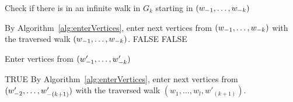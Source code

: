 \begin{algorithm}
  \caption{Check if there is in an infinite walk in $G_k$ starting in $\tuple{1}{k}$}
    \label{alg:checkCycles}
  \begin{algorithmic}[1]
		\STATE By Algorithm~\ref{alg:enterVertices}, enter next vertices from $\tuple{1}{k}$ with the traversed walk  $\tuple{1}{k}$.
	\ELSE
		\RETURN FALSE
	\ENDIF
	\RETURN FALSE
  \end{algorithmic}
\end{algorithm}

\begin{algorithm}
  \caption{Enter vertices from $\tuple[w']{1}{k}$}
    \label{alg:enterVertices}
  \begin{algorithmic}[1]
			\RETURN TRUE
		\ELSE
			\STATE By Algorithm~\ref{alg:enterVertices}, enter next vertices from $\tuple[w']{2}{(k+1)}$ with the traversed walk   $(w_1, \dots, w_l, w'_{(k+1)})$.
		\ENDIF
	\ENDFOR
  \end{algorithmic}
\end{algorithm}



